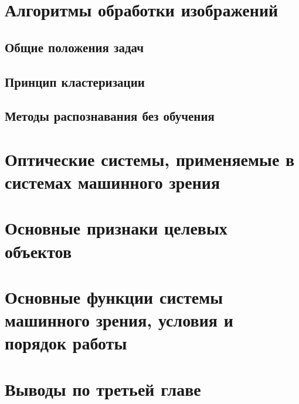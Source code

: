 \section{Алгоритмы обработки изображений} \label{sect3_2}

\subsection{Общие положения задач}

\subsection{Принцип кластеризации}

\subsection{Методы распознавания без обучения}

\section{Оптические системы, применяемые в системах машинного зрения} \label{sect3_3}

\section{Основные признаки целевых объектов} \label{sect3_4}

\section{Основные функции системы машинного зрения, условия и порядок работы} \label{sect3_5}

\section{Выводы по третьей главе} \label{sect3_6}